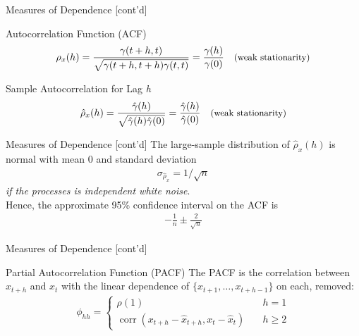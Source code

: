 \documentclass[ignorenonframetext,xcolor=x11names]{beamer}
\begin{document}
\begin{frame}{Measures of Dependence \small [cont'd]}
\begin{block}{Autocorrelation Function (ACF)}
\begin{align*}
\rho_x(h) = \frac{\gamma (t+h,t)}{\sqrt{\gamma (t+h,t+h) \gamma(t, t)}} = \frac{\gamma(h)}{\gamma(0)}  \quad \text{\small (weak stationarity)}
\end{align*}
\end{block}
\begin{block}{Sample Autocorrelation for Lag \emph{h}}
\begin{align*}
\hat\rho_x(h) = \frac{\hat\gamma(h)}{\sqrt{\hat\gamma(h) \hat\gamma(0)}} = \frac{\hat\gamma(h)}{\hat\gamma(0)} \quad \text{\small (weak stationarity)}
\end{align*}
\end{block}
\end{frame}

\begin{frame}{Measures of Dependence \small [cont'd]}
The large-sample distribution of $\hat{\rho}_{x}(h)$ is normal with mean $0$ and standard deviation
\begin{align*}
\sigma_{\hat{\rho}_{x}} = 1/ \sqrt{n} 
\end{align*}
\emph{if the processes is independent white noise}. \\

Hence, the approximate 95\% confidence interval on the ACF is
\begin{align*}
-\frac{1}{n} \pm \frac{2}{\sqrt{n}}
\end{align*}
\end{frame}


\begin{frame}[fragile]{Measures of Dependence \small [cont'd]}
\begin{block}{Partial Autocorrelation Function (PACF)}
The PACF is the correlation between $x_{t+h}$ and $x_t$ with the linear dependence of $\{x_{t+1}, \ldots, x_{t+h-1}\}$ on each, removed:
\begin{align*}
\phi_{hh} = \begin{cases}\rho(1) &\quad h = 1 \\
 \operatorname{corr}(x_{t+h} - \hat{x}_{t+h}, x_t - \hat{x}_t) &\quad h \geq 2
 \end{cases}
\end{align*}
\end{block}
\end{frame}
\end{document}
